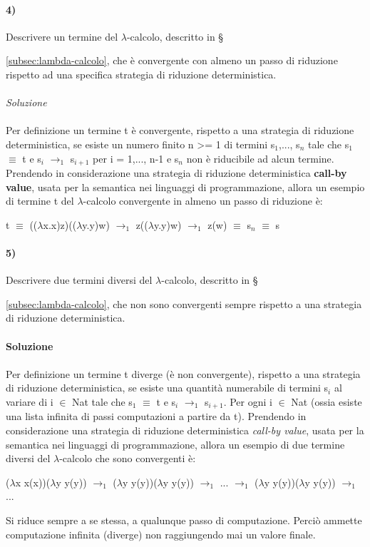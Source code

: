 \paragraph{4)}
Descrivere un termine del $\lambda$-calcolo, descritto in \S{\ref{subsec:lambda-calcolo},  che \`e convergente con almeno un passo di riduzione rispetto ad una specifica strategia di riduzione deterministica.\\\\
\textit{Soluzione}\\\\
Per definizione un termine t \`e convergente, rispetto a una strategia di
riduzione deterministica, se esiste un numero finito n >= 1 di termini s$_1$,..., s$_n$ tale che s$_1$ $\equiv$ t e s$_i$ $\rightarrow_1$ s$_{i + 1}$ per i = 1,..., n-1 e s$_n$ non \`e riducibile ad alcun termine.\\
Prendendo in considerazione una strategia di riduzione deterministica \textbf{call-by value}, usata per la semantica nei linguaggi di programmazione, allora un esempio di termine t del $\lambda$-calcolo convergente in almeno un passo di riduzione \`e:
\begin{center}t $\equiv$ (($\lambda$x.x)z)(($\lambda$y.y)w) $\rightarrow_1$ z(($\lambda$y.y)w) $\rightarrow_1$ z(w) $\equiv$ s$_n$ $\equiv$ s\end{center}
\paragraph{5)} 
Descrivere due termini diversi del $\lambda$-calcolo, descritto in \S{\ref{subsec:lambda-calcolo}, che non sono convergenti sempre rispetto a una strategia di riduzione deterministica.\\\\
\textbf{Soluzione}\\\\
Per definizione un termine t diverge (\`e non convergente), rispetto a una strategia
di riduzione deterministica, se esiste una quantit\`a numerabile di termini s$_i$ al variare di i $\in$ Nat tale che s$_1$ $\equiv$ t e s$_i$ $\rightarrow_1$ s$_{i+1}$. Per ogni i $\in$ Nat (ossia esiste una lista infinita di passi computazioni a partire da t).
Prendendo in considerazione una strategia di riduzione deterministica \textit{call-by value}, usata per la semantica nei linguaggi di programmazione, allora un esempio di due termine diversi del $\lambda$-calcolo che sono convergenti \`e:
\begin{center}($\lambda$x x(x))($\lambda$y y(y)) $\rightarrow_1$ ($\lambda$y y(y))($\lambda$y y(y))  $\rightarrow_1$ ... $\rightarrow_1$ ($\lambda$y y(y))($\lambda$y y(y)) $\rightarrow_1$ ... \end{center}
Si riduce sempre a se stessa, a qualunque passo di computazione. Perci\`o ammette computazione infinita (diverge) non raggiungendo mai un valore finale.
}}
